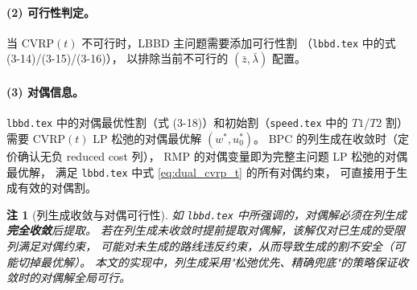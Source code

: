 \documentclass{article}
\newtheorem{remark}{注}
\begin{document}
\paragraph{(2) 可行性判定。}
当 $\text{CVRP}(t)$ 不可行时，LBBD 主问题需要添加可行性割
（\texttt{lbbd.tex} 中的式 (3-14)/(3-15)/(3-16)），
以排除当前不可行的 $(\bar z, \bar\lambda)$ 配置。

\paragraph{(3) 对偶信息。}
\texttt{lbbd.tex} 中的对偶最优性割（式 (3-18)）和初始割（\texttt{speed.tex} 中的 $T1$/$T2$ 割）
需要 CVRP$(t)$ LP 松弛的对偶最优解 $(w^*, u_0^*)$。
BPC 的列生成在收敛时（定价确认无负 reduced cost 列），
RMP 的对偶变量即为完整主问题 LP 松弛的对偶最优解，
满足 \texttt{lbbd.tex} 中式 \eqref{eq:dual_cvrp_t} 的所有对偶约束，
可直接用于生成有效的对偶割。

\begin{remark}[列生成收敛与对偶可行性]
如 \texttt{lbbd.tex} 中所强调的，对偶解必须在列生成\textbf{完全收敛}后提取。
若在列生成未收敛时提前提取对偶解，该解仅对已生成的受限列满足对偶约束，
可能对未生成的路线违反约束，从而导致生成的割不安全（可能切掉最优解）。
本文的实现中，列生成采用"松弛优先、精确兜底"的策略保证收敛时的对偶解全局可行。
\end{remark}
\end{document}
